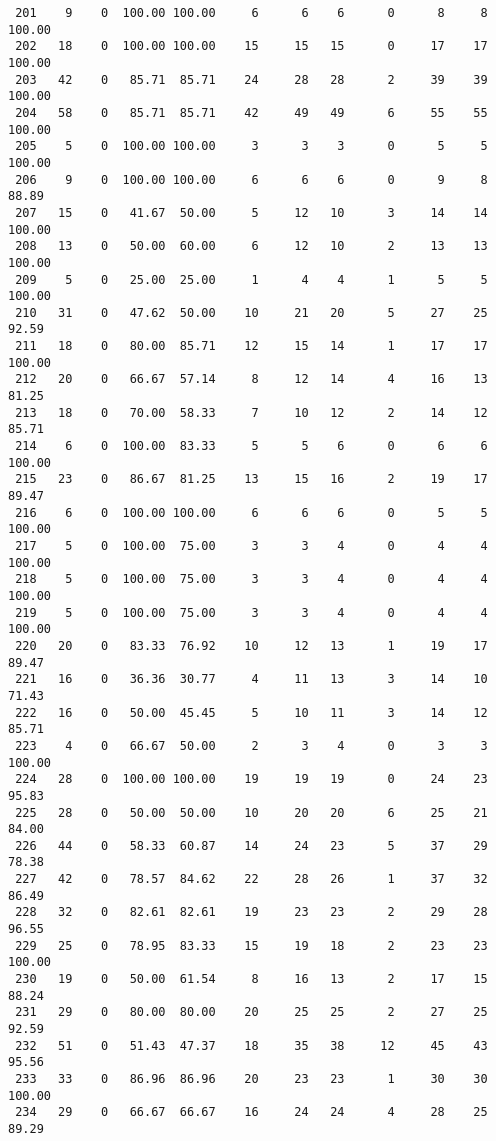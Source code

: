 \begin{verbatim}
 201    9    0  100.00 100.00     6      6    6      0      8     8   100.00
 202   18    0  100.00 100.00    15     15   15      0     17    17   100.00
 203   42    0   85.71  85.71    24     28   28      2     39    39   100.00
 204   58    0   85.71  85.71    42     49   49      6     55    55   100.00
 205    5    0  100.00 100.00     3      3    3      0      5     5   100.00
 206    9    0  100.00 100.00     6      6    6      0      9     8    88.89
 207   15    0   41.67  50.00     5     12   10      3     14    14   100.00
 208   13    0   50.00  60.00     6     12   10      2     13    13   100.00
 209    5    0   25.00  25.00     1      4    4      1      5     5   100.00
 210   31    0   47.62  50.00    10     21   20      5     27    25    92.59
 211   18    0   80.00  85.71    12     15   14      1     17    17   100.00
 212   20    0   66.67  57.14     8     12   14      4     16    13    81.25
 213   18    0   70.00  58.33     7     10   12      2     14    12    85.71
 214    6    0  100.00  83.33     5      5    6      0      6     6   100.00
 215   23    0   86.67  81.25    13     15   16      2     19    17    89.47
 216    6    0  100.00 100.00     6      6    6      0      5     5   100.00
 217    5    0  100.00  75.00     3      3    4      0      4     4   100.00
 218    5    0  100.00  75.00     3      3    4      0      4     4   100.00
 219    5    0  100.00  75.00     3      3    4      0      4     4   100.00
 220   20    0   83.33  76.92    10     12   13      1     19    17    89.47
 221   16    0   36.36  30.77     4     11   13      3     14    10    71.43
 222   16    0   50.00  45.45     5     10   11      3     14    12    85.71
 223    4    0   66.67  50.00     2      3    4      0      3     3   100.00
 224   28    0  100.00 100.00    19     19   19      0     24    23    95.83
 225   28    0   50.00  50.00    10     20   20      6     25    21    84.00
 226   44    0   58.33  60.87    14     24   23      5     37    29    78.38
 227   42    0   78.57  84.62    22     28   26      1     37    32    86.49
 228   32    0   82.61  82.61    19     23   23      2     29    28    96.55
 229   25    0   78.95  83.33    15     19   18      2     23    23   100.00
 230   19    0   50.00  61.54     8     16   13      2     17    15    88.24
 231   29    0   80.00  80.00    20     25   25      2     27    25    92.59
 232   51    0   51.43  47.37    18     35   38     12     45    43    95.56
 233   33    0   86.96  86.96    20     23   23      1     30    30   100.00
 234   29    0   66.67  66.67    16     24   24      4     28    25    89.29

\end{verbatim}
